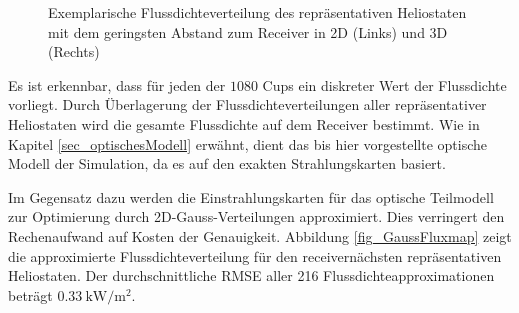 \begin{figure}[h!]
{\begin{subfigure}[b]{0.48\textwidth}
            \label{fig_CasadiFluxmap3D}
        \end{subfigure}
        \hfill}
    \caption[Exemplarische Flussdichteverteilung des repräsentativen Heliostaten mit dem geringsten Abstand zum Receiver in 2D und 3D]{Exemplarische Flussdichteverteilung des repräsentativen Heliostaten mit dem geringsten Abstand zum Receiver in 2D (Links) und 3D (Rechts)}
    \label{fig_CasadiFluxmap}
\end{figure}

Es ist erkennbar, dass für jeden der $1080$ Cups ein diskreter Wert der Flussdichte vorliegt.
Durch Überlagerung der Flussdichteverteilungen aller repräsentativer Heliostaten wird die gesamte Flussdichte auf dem Receiver bestimmt.
Wie in Kapitel \ref{sec_optischesModell} erwähnt, dient das bis hier vorgestellte optische Modell der Simulation, da es auf den exakten Strahlungskarten basiert.

Im Gegensatz dazu werden die Einstrahlungskarten für das optische Teilmodell zur Optimierung durch 2D-Gauss-Verteilungen approximiert.
Dies verringert den Rechenaufwand auf Kosten der Genauigkeit.
Abbildung \ref{fig_GaussFluxmap} zeigt die approximierte Flussdichteverteilung für den receivernächsten repräsentativen Heliostaten.
Der durchschnittliche RMSE aller 216 Flussdichteapproximationen beträgt $\SI{0.33}{\kilo\watt\per\metre\squared}$.

